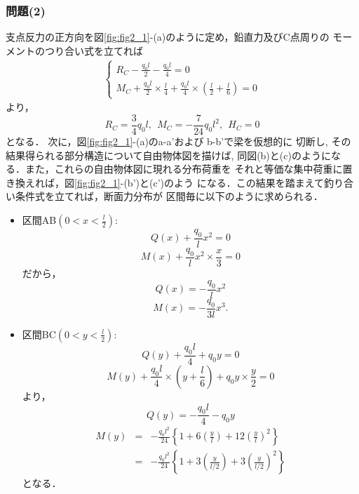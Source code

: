 \documentclass[10pt,a4j]{jarticle}
\begin{document}
\subsubsection*{問題(2)}
支点反力の正方向を図\ref{fig:fig2_1}-(a)のように定め，鉛直力及びC点周りの
モーメントのつり合い式を立てれば
\begin{eqnarray}
	\left\{
	\begin{array}{ll}
		R_C - \frac{q_0l}{2}-\frac{q_0l}{4}= 0 \\
		M_C+\frac{q_0l}{2} \times \frac{l}{4}+
		\frac{q_0l}{4} \times \left( \frac{l}{2}+\frac{l}{6} \right)=0 
	\end{array}
	\right.
\end{eqnarray}
より，
\begin{equation}
	R_C = \frac{3}{4}q_0l, \ \ M_C=-\frac{7}{24}q_0l^2, \ \ H_C=0
\end{equation}
となる．
次に，図\ref{fig:fig2_1}-(a)のa-a'および b-b'で梁を仮想的に
切断し, その結果得られる部分構造について自由物体図を描けば, 
同図(b)と(c)のようになる．また，これらの自由物体図に現れる分布荷重を
それと等価な集中荷重に置き換えれば，図\ref{fig:fig2_1}-(b')と(c')のよう
になる．この結果を踏まえて釣り合い条件式を立てれば，断面力分布が
区間毎に以下のように求められる．
\begin{itemize}
\item
	区間AB$\left( 0<x<\frac{l}{2}\right)$:\\
	\begin{equation}
		Q(x) + \frac{q_0}{l}x^2 = 0
	\end{equation}
	\begin{equation}
		M(x) + \frac{q_0}{l}x^2 \times \frac{x}{3}= 0
	\end{equation}
	だから，
	\begin{equation}
		Q(x) =- \frac{q_0}{l}x^2
	\end{equation}
	\begin{equation}
		M(x) =-\frac{q_0}{3l}x^3.
	\end{equation}
\item
	区間BC$\left( 0<y<\frac{l}{2}\right)$:\\
	\begin{equation}
		Q(y) + \frac{q_0l}{4}+q_0y = 0
	\end{equation}
	\begin{equation}
		M(y)+ \frac{q_0l}{4}\times \left(y+\frac{l}{6}\right) + q_0y \times \frac{y}{2} =0
	\end{equation}
	より，
	\begin{equation}
		Q(y) =- \frac{q_0l}{4}-q_0y
	\end{equation}
	\begin{eqnarray}
		M(y)  
		&=& 
		-\frac{q_0l^2}{24} \left\{ 
			1 + 6\left( \frac{y}{l}\right)
			+ 12\left( \frac{y}{l}\right)^2
		\right\}	
		\nonumber 
		\\
		&=& 
		-\frac{q_0l^2}{24} \left\{ 
			1 + 3\left( \frac{y}{l/2}\right)
			+ 3\left( \frac{y}{l/2}\right)^2
		\right\}	
		\label{eqn:My_prb2}
	\end{eqnarray}
	となる．
\end{itemize}
\end{document}

